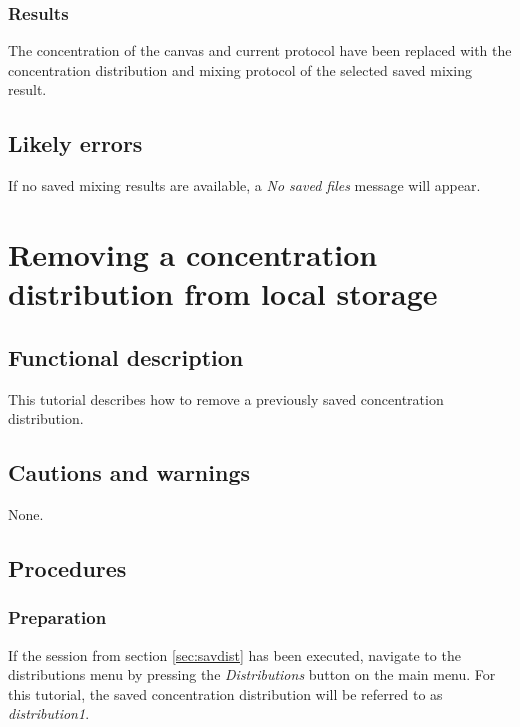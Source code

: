 \subsubsection{Results}
The concentration of the canvas and current protocol have been replaced with the concentration distribution and mixing protocol of the selected saved mixing result.

\subsection{Likely errors}
If no saved mixing results are available, a \emph{No saved files} message will appear.


\section{Removing a concentration distribution from local storage}\label{sec:remdist}

\subsection{Functional description}
This tutorial describes how to remove a previously saved concentration distribution.

\subsection{Cautions and warnings}
None.

\subsection{Procedures}

\subsubsection{Preparation}
If the session from section \ref{sec:savdist} has been executed, navigate to the distributions menu by pressing the \emph{Distributions} button on the main menu.
For this tutorial, the saved concentration distribution will be referred to as \emph{distribution1}.

